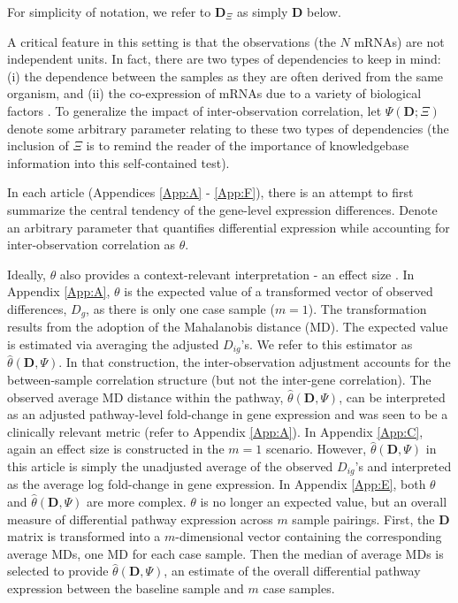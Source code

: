 \noindent \noindent For simplicity of notation, we refer to $\mathbf{D}_{\Xi}$ as simply $\mathbf{D}$ below.

A critical feature in this setting is that the observations (the $N$ mRNAs) are not independent units. In fact, there are two types of dependencies to keep in mind: (i) the dependence between the samples as they are often derived from the same organism, and (ii) the co-expression of mRNAs due to a variety of biological factors \citep{Kitano2002}. To generalize the impact of inter-observation correlation, let $\Psi(\mathbf{D}; \Xi)$ denote some arbitrary parameter relating to these two types of dependencies (the inclusion of $\Xi$ is to remind the reader of the importance of knowledgebase information into this self-contained test).

In each article (Appendices \ref{App:A} - \ref{App:F}), there is an attempt to first summarize the central tendency of the gene-level expression differences. Denote an arbitrary parameter that quantifies differential expression while accounting for inter-observation correlation as $\theta$.

Ideally, $\theta$ also provides a context-relevant interpretation - an effect size \citep{Nakagawa2007}. In Appendix \ref{App:A}, $\theta$ is the expected value of a transformed vector of observed differences, $D_{g}$, as there is only one case sample ($m=1$). The transformation results from the adoption of the Mahalanobis distance (MD). The expected value is estimated via averaging the adjusted $D_{ig}$\rq s. We refer to this estimator as $\hat{\theta}(\mathbf{D}, \Psi)$. In that construction, the inter-observation adjustment accounts for the between-sample correlation structure (but not the inter-gene correlation). The observed average MD distance within the pathway, $\hat{\theta}(\mathbf{D}, \Psi)$, can be interpreted as an adjusted pathway-level fold-change in gene expression and was seen to be a clinically relevant metric (refer to Appendix \ref{App:A}). In Appendix \ref{App:C}, again an effect size is constructed in the $m=1$ scenario. However, $\hat{\theta}(\mathbf{D}, \Psi)$ in this article is simply the unadjusted average of the observed $D_{ig}$\rq s and interpreted as the average log fold-change in gene expression. In Appendix \ref{App:E}, both $\theta$ and $\hat{\theta}(\mathbf{D}, \Psi)$ are more complex. $\theta$ is no longer an expected value, but an overall measure of differential pathway expression across $m$ sample pairings. First, the $\mathbf{D}$ matrix is transformed into a $m$-dimensional vector containing the corresponding average MDs, one MD for each case sample. Then the median of average MDs is selected to provide $\hat{\theta}(\mathbf{D}, \Psi)$, an estimate of the overall differential pathway expression between the baseline sample and $m$ case samples.

